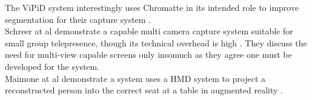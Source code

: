 The ViPiD system interestingly uses Chromatte in its intended role to improve segmentation for their capture system \cite{Klie2006}. \\
Schreer at al demonstrate a capable multi camera capture system suitable for small group telepresence, though its technical overhead is high \cite{Schreer:2008ty}. They discuss the need for multi-view capable screens only insomuch as they agree one must be developed for the system.\\
Maimone at al demonstrate a system uses a HMD system to project a reconstructed person into the correct seat at a table in augmented reality \cite{Maimone2013}.\\
                        


